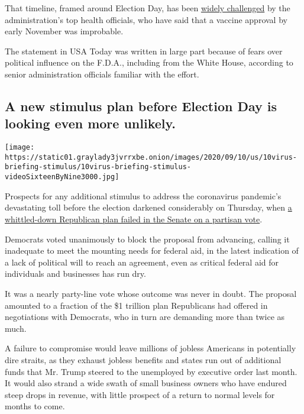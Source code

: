 That timeline, framed around Election Day, has been
\href{https://www.nytimes3xbfgragh.onion/2020/09/04/science/covid-vaccine-pharma-pledge.html}{widely
challenged} by the administration's top health officials, who have said
that a vaccine approval by early November was improbable.

The statement in USA Today was written in large part because of fears
over political influence on the F.D.A., including from the White House,
according to senior administration officials familiar with the effort.

\hypertarget{a-new-stimulus-plan-before-election-day-is-looking-even-more-unlikely}{%
\subsection{A new stimulus plan before Election Day is looking even more
unlikely.}\label{a-new-stimulus-plan-before-election-day-is-looking-even-more-unlikely}}

\texttt{[image: https://static01.graylady3jvrrxbe.onion/images/2020/09/10/us/10virus-briefing-stimulus/10virus-briefing-stimulus-videoSixteenByNine3000.jpg]}

Prospects for any additional stimulus to address the coronavirus
pandemic's devastating toll before the election darkened considerably on
Thursday, when
\href{https://www.nytimes3xbfgragh.onion/2020/09/10/us/politics/second-stimulus-check.html}{a
whittled-down Republican plan failed in the Senate on a partisan vote}.

Democrats voted unanimously to block the proposal from advancing,
calling it inadequate to meet the mounting needs for federal aid, in the
latest indication of a lack of political will to reach an agreement,
even as critical federal aid for individuals and businesses has run dry.

It was a nearly party-line vote whose outcome was never in doubt. The
proposal amounted to a fraction of the \$1 trillion plan Republicans had
offered in negotiations with Democrats, who in turn are demanding more
than twice as much.

A failure to compromise would leave millions of jobless Americans in
potentially dire straits, as they exhaust jobless benefits and states
run out of additional funds that Mr. Trump steered to the unemployed by
executive order last month. It would also strand a wide swath of small
business owners who have endured steep drops in revenue, with little
prospect of a return to normal levels for months to come.

